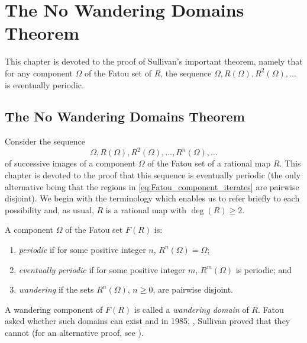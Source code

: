 \chapter{The No Wandering Domains Theorem}
\label{chp:the_no_wandering_domains_theorem}

This chapter is devoted to the proof of Sullivan's important theorem, namely
that for any component $\Omega$ of the Fatou set of $R$, the sequence $\Omega,
R(\Omega), R^2(\Omega), \dots$ is eventually periodic.

\section{The No Wandering Domains Theorem}
\label{sec:the_no_wandering_domains_theorem}

Consider the sequence
\begin{equation}
    \label{eq:Fatou_component_iterates}
    \Omega, R(\Omega), R^2(\Omega), \dots, R^n(\Omega), \dots
\end{equation}
of successive images of a component $\Omega$ of the Fatou set of a rational map
$R$. This chapter is devoted to the proof that this sequence is eventually
periodic (the only alternative being that the regions in
\eqref{eq:Fatou_component_iterates} are pairwise disjoint). We begin with the
terminology which enables us to refer briefly to each possibility and, as usual,
$R$ is a rational map with $\deg(R) \geq 2$.

\begin{definition}
    A component $\Omega$ of the Fatou set $F(R)$ is:
    \begin{enumerate}[label=(\alph*)]
        \item \emph{periodic} if for some positive integer $n$, $R^n(\Omega) =
        \Omega$;
        \item \emph{eventually periodic} if for some positive integer $m$,
        $R^m(\Omega)$ is periodic; and
        \item \emph{wandering} if the sets $R^n(\Omega)$, $n \geq 0$, are
        pairwise disjoint.
    \end{enumerate}
\end{definition}

A wandering component of $F(R)$ is called a \emph{wandering domain} of $R$.
Fatou asked whether such domains can exist and in 1985, \cite{Sullivan1985},
Sullivan proved that they cannot (for an alternative proof, see
\cite{Bers1987}).

